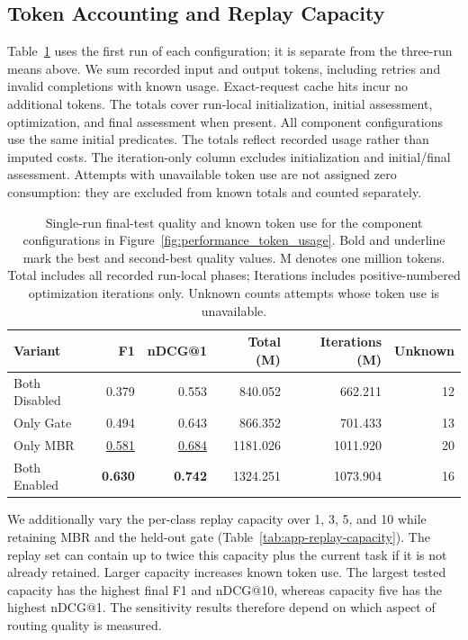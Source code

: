 \subsection{Token Accounting and Replay Capacity}
Table~\ref{tab:app-ablation-tokens} uses the first run of each configuration; it is separate from the three-run means above. We sum recorded input and output tokens, including retries and invalid completions with known usage. Exact-request cache hits incur no additional tokens. The totals cover run-local initialization, initial assessment, optimization, and final assessment when present. All component configurations use the same initial predicates. The totals reflect recorded usage rather than imputed costs. The iteration-only column excludes initialization and initial/final assessment. Attempts with unavailable token use are not assigned zero consumption: they are excluded from known totals and counted separately.

\begin{table}[t]
\centering
\small
\begin{tabular}{lrrrrr}
\toprule
Variant & F1 & nDCG@1 & Total (M) & Iterations (M) & Unknown \\
\midrule
Both Disabled & 0.379 & 0.553 & 840.052 & 662.211 & 12 \\
Only Gate & 0.494 & 0.643 & 866.352 & 701.433 & 13 \\
Only MBR & \underline{0.581} & \underline{0.684} & 1181.026 & 1011.920 & 20 \\
Both Enabled & \textbf{0.630} & \textbf{0.742} & 1324.251 & 1073.904 & 16 \\
\bottomrule
\end{tabular}
\caption{Single-run final-test quality and known token use for the component configurations in Figure~\ref{fig:performance_token_usage}. Bold and underline mark the best and second-best quality values. M denotes one million tokens. Total includes all recorded run-local phases; Iterations includes positive-numbered optimization iterations only. Unknown counts attempts whose token use is unavailable.}
\label{tab:app-ablation-tokens}
\end{table}

We additionally vary the per-class replay capacity over 1, 3, 5, and 10 while retaining MBR and the held-out gate (Table~\ref{tab:app-replay-capacity}). The replay set can contain up to twice this capacity plus the current task if it is not already retained. Larger capacity increases known token use. The largest tested capacity has the highest final F1 and nDCG@10, whereas capacity five has the highest nDCG@1. The sensitivity results therefore depend on which aspect of routing quality is measured.

